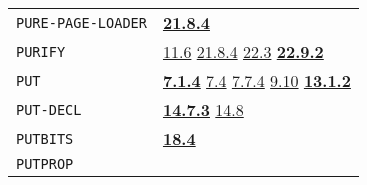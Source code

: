 \documentclass[a4paper,]{article}
\begin{document}
\begin{longtable}[]{@{}ll@{}}
\begin{minipage}[t]{0.24\columnwidth}
\texttt{PURE-PAGE-LOADER}\strut
\end{minipage} & \begin{minipage}[t]{0.70\columnwidth}\raggedright\strut
\textbf{\href{21-interrupts.md\#2184-gc}{21.8.4}}\strut
\end{minipage}\tabularnewline
\begin{minipage}[t]{0.24\columnwidth}\raggedright\strut
\texttt{PURIFY}\strut
\end{minipage} & \begin{minipage}[t]{0.70\columnwidth}\raggedright\strut
\href{11-input-output.md\#116-save-files}{11.6} \href{21-interrupts.md\#2184-gc}{21.8.4}
\href{22-storage-management.md\#223-other-storage}{22.3}
\textbf{\href{22-storage-management.md\#2292-purify}{22.9.2}}\strut
\end{minipage}\tabularnewline
\begin{minipage}[t]{0.24\columnwidth}\raggedright\strut
\texttt{PUT}\strut
\end{minipage} & \begin{minipage}[t]{0.70\columnwidth}\raggedright\strut
\textbf{\href{07-structured-objects.md\#714-put-1}{7.1.4}} \href{07-structured-objects.md\#74-examples-1}{7.4}
\href{07-structured-objects.md\#774-note-on-efficiency-1}{7.7.4} \href{09-functions.md\#910-apply-1}{9.10}
\textbf{\href{13-association-properties.md\#1312-put}{13.1.2}}\strut
\end{minipage}\tabularnewline
\begin{minipage}[t]{0.24\columnwidth}\raggedright\strut
\texttt{PUT-DECL}\strut
\end{minipage} & \begin{minipage}[t]{0.70\columnwidth}\raggedright\strut
\textbf{\href{14-data-type-declarations.md\#1473-get-decl-and-put-decl}{14.7.3}}
\href{14-data-type-declarations.md\#148-offset}{14.8}\strut
\end{minipage}\tabularnewline
\begin{minipage}[t]{0.24\columnwidth}\raggedright\strut
\texttt{PUTBITS}\strut
\end{minipage} & \begin{minipage}[t]{0.70\columnwidth}\raggedright\strut
\textbf{\href{18-machine-words-and-bits.md\#184-putbits}{18.4}}\strut
\end{minipage}\tabularnewline
\begin{minipage}[t]{0.24\columnwidth}\raggedright\strut
\texttt{PUTPROP}\strut
\end{minipage} & \begin{minipage}[t]{0.70\columnwidth}\raggedright\strut

\end{minipage}
\end{longtable}
\end{document}
